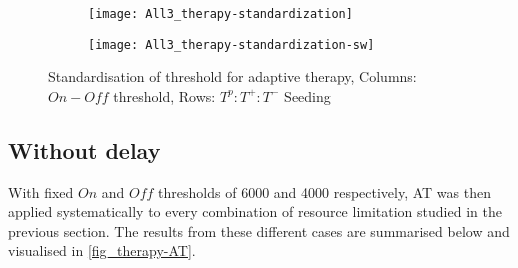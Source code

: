 \begin{figure}[h!]
  \centering
  \begin{subfigure}[b]{\textwidth}
    \centering
    \texttt{[image: All3\_therapy-standardization]}
  \end{subfigure}
  \begin{subfigure}[b]{\textwidth}
    \centering
    \texttt{[image: All3\_therapy-standardization-sw]}
  \end{subfigure}
  \caption[Standardisation of threshold for adaptive therapy]{Standardisation of threshold for adaptive therapy, Columns: $On-Off$ threshold, Rows: $T^p:T^+:T^-$ Seeding}
  \label{fig_therapy-AT_standardization}
\end{figure}

\newpage

\subsection{Without delay}
With fixed $On$ and $Off$ thresholds of 6000 and 4000 respectively, AT was then applied systematically to every combination of resource limitation studied in the previous section. The results from these different cases are summarised below and visualised in \autoref{fig_therapy-AT}.
